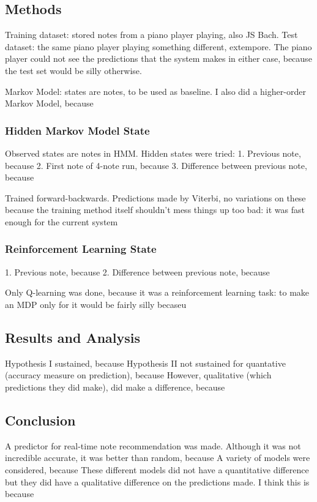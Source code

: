 \documentclass{article}
\begin{document}
\subsection*{Methods}
Training dataset: stored notes from a piano player playing, also JS Bach.
Test dataset: the same piano player playing something different, extempore.
The piano player could not see the predictions that the system makes in either case, because the test set would be silly otherwise.

Markov Model: states are notes, to be used as baseline. I also did a higher-order Markov Model, because %

\subsubsection*{Hidden Markov Model State}
Observed states are notes in HMM.
Hidden states were tried:
1. Previous note, because %
2. First note of 4-note run, because %
3. Difference between previous note, because %

Trained forward-backwards. Predictions made by Viterbi, no variations on these because the training method itself shouldn't mess things up too bad: it was fast enough for the current system

\subsubsection*{Reinforcement Learning State}
1. Previous note, because %
2. Difference between previous note, because %

Only Q-learning was done, because it was a reinforcement learning task: to make an MDP only for it would be fairly silly becaseu %
\subsection*{Results and Analysis}
Hypothesis I sustained, because %
Hypothesis II not sustained for quantative (accuracy measure on prediction), because %
However, qualitative (which predictions they did make), did make a difference, because %

\subsection*{Conclusion}
A predictor for real-time note recommendation was made.
Although it was not incredible accurate, it was better than random, because %
A variety of models were considered, because %
These different models did not have a quantitative difference but they did have a qualitative difference on the predictions made. I think this is because %
\end{document}
